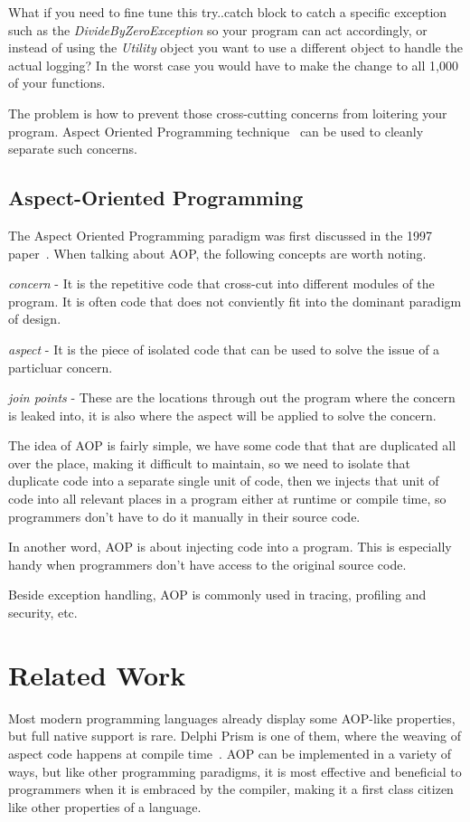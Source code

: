What if you need to fine tune this try..catch block to catch a specific exception such as the {\em DivideByZeroException} so your program can act accordingly, or instead of using the {\em Utility} object you want to use a different object to handle the actual logging? In the worst case you would have to make the change to all 1,000 of your functions.

The problem is how to prevent those cross-cutting concerns from loitering your program. Aspect Oriented Programming technique~\cite{aop} can be used to cleanly separate such concerns.

\subsection{Aspect-Oriented Programming}
The Aspect Oriented Programming paradigm was first discussed in the 1997 paper~\cite{aop}. When talking about AOP, the following concepts are worth noting.

{\em concern} - It is the repetitive code that cross-cut into different modules of the program. It is often code that does not conviently fit into the dominant paradigm of design.

{\em aspect} - It is the piece of isolated code that can be used to solve the issue of a particluar concern.

{\em join points} - These are the locations through out the program where the concern is leaked into, it is also where the aspect will be applied to solve the concern.

The idea of AOP is fairly simple, we have some code that that are duplicated all over the place, making it difficult to maintain, so we need to isolate that duplicate code into a separate single unit of code, then we injects that unit of code into all relevant places in a program either at runtime or compile time, so programmers don't have to do it manually in their source code.

In another word, AOP is about injecting code into a program. This is especially handy when programmers don't have access to the original source code.

Beside exception handling, AOP is commonly used in tracing, profiling and security, etc.

\section{Related Work}Most modern programming languages already display some AOP-like properties, but full native support is rare. Delphi Prism is one of them, where the weaving of aspect code happens at compile time~\cite{delphi_prism2010}. AOP can be implemented in a variety of ways, but like other programming paradigms, it is most effective and beneficial to programmers when it is embraced by the compiler, making it a first class citizen like other properties of a language.

